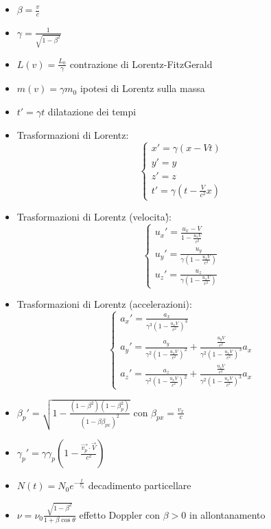 \documentclass[a4paper]{article}
\begin{document}
        \begin{itemize}
            \item $\beta=\frac{v}{c}$
            \item $\gamma=\frac{1}{\sqrt{1-\beta^2}}$
            \item $L(v)=\frac{L_0}{\gamma}$ contrazione di Lorentz-FitzGerald
            \item $m(v)=\gamma m_0$ ipotesi di Lorentz sulla massa
            \item $t'=\gamma t$ dilatazione dei tempi
            \item Trasformazioni di Lorentz:\\
                $$\begin{cases}
                    x'=\gamma(x-Vt)\\
                    y'=y\\
                    z'=z\\
                    t'=\gamma\left(t-\frac{V}{c^2}x\right)
                \end{cases}$$
            \item Trasformazioni di Lorentz (velocita\'):\\
                $$\begin{cases}
                    u_x'=\frac{u_x-V}{1-\frac{u_xV}{c^2}}\\
                    u_y'=\frac{u_y}{\gamma\left(1-\frac{u_xV}{c^2}\right)}\\
                    u_z'=\frac{u_z}{\gamma\left(1-\frac{u_xV}{c^2}\right)}
                \end{cases}$$
            \item Trasformazioni di Lorentz (accelerazioni):\\
                $$\begin{cases}
                    a_x'=\frac{a_x}{\gamma^3\left(1-\frac{u_xV}{c^2}\right)^3}\\
                    a_y'=\frac{a_y}{\gamma^2\left(1-\frac{u_xV}{c^2}\right)^2}+\frac{\frac{u_yV}{c^2}}{\gamma^2\left(1-\frac{u_xV}{c^2}\right)^3}a_x\\
                    a_z'=\frac{a_z}{\gamma^2\left(1-\frac{u_xV}{c^2}\right)^2}+\frac{\frac{u_zV}{c^2}}{\gamma^2\left(1-\frac{u_xV}{c^2}\right)^3}a_x
                \end{cases}$$
            \item $\beta_p'=\sqrt{1-\frac{(1-\beta^2)(1-\beta_p^2)}{(1-\beta\beta_{px})^2}}$ con $\beta_{px}=\frac{v_x}{c}$
            \item $\gamma_p'=\gamma\gamma_p\left(1-\frac{\vec{v_p}\cdot\vec{V}}{c^2}\right)$
            \item $N(t)=N_0e^{-\frac{t}{\tau_0}}$ decadimento particellare
            \item $\nu=\nu_0\frac{\sqrt{1-\beta^2}}{1+\beta\cos{\theta}}$ effetto Doppler con $\beta>0$ in allontanamento
        \end{itemize}
\end{document}
